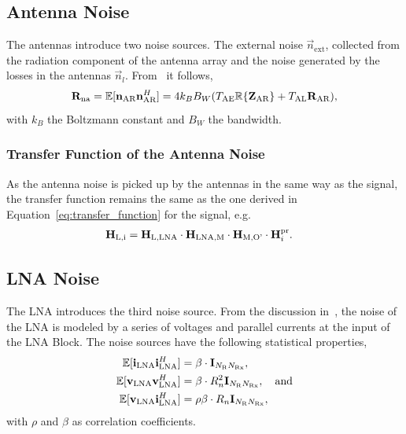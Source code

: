 \subsection{Antenna Noise}
\label{sec:antenna_noise}

The antennas introduce two noise sources.
The external noise $\vec{n}_\text{ext}$, collected from the radiation component of the antenna array and the noise generated by the losses in the antennas $\vec{n}_l$.
From~\cite{Twiss1955} it follows, 
\begin{equation}
\label{eq:cov_ant}
\mathbf{R}_\text{na} = \mathbb{E}[\mathbf{n}_\text{AR}\mathbf{n}_\text{AR}^H] = 4 k_B B_W(T_\text{AE}\mathbb{R}\{\mathbf{Z}_\text{AR}\}+T_\text{AL}\mathbf{R}_\text{AR}),
\end{equation}
with $k_B$ the Boltzmann constant and $B_W$ the bandwidth.

\subsubsection{Transfer Function of the Antenna Noise}
\label{sec:antenna_noise_transf}
As the antenna noise is picked up by the antennas in the same way as the signal, the transfer function remains the same as the one derived in Equation~\eqref{eq:transfer_function} for the signal, e.g.
\begin{align}
\mathbf{H}_\text{L,i} &= \mathbf{H}_\text{L,LNA}\cdot\mathbf{H}_\text{LNA,M}\cdot\mathbf{H}_\text{M,O'} \cdot \mathbf{H}_i^{\text{pr}}.
\end{align}

\subsection{LNA Noise}
\label{sec:lna_noise}

The LNA introduces the third noise source.
From the discussion in~\cite{Nossek}, the noise of the LNA is modeled by a series of voltages and parallel currents at the input of the LNA Block.
The noise sources have the following statistical properties,
\begin{align}
\label{eq:cov_lna}
\mathbb{E}[\mathbf{i}_\text{LNA}\mathbf{i}_\text{LNA}^H] &= \beta \cdot \mathbf{I}_{N_\text{R}N_\text{Rx}},\\\nonumber
\mathbb{E}[\mathbf{v}_\text{LNA}\mathbf{v}_\text{LNA}^H] &= \beta \cdot R_n^2\mathbf{I}_{N_\text{R}N_\text{Rx}},\quad\text{and}\\\nonumber
\mathbb{E}[\mathbf{v}_\text{LNA}\mathbf{i}_\text{LNA}^H] &= \rho \beta \cdot R_n\mathbf{I}_{N_\text{R}N_\text{Rx}},
\end{align}
with $\rho$ and $\beta$ as correlation coefficients.

